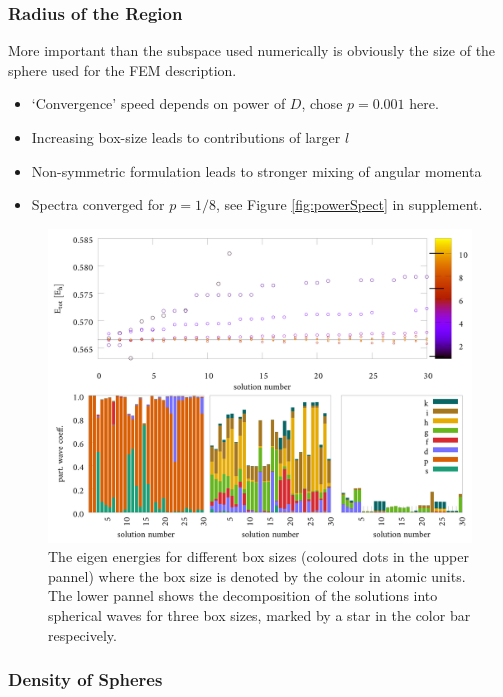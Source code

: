 \subsubsection{Radius of the Region}
\label{ch:bmSize}
More important than the subspace used numerically is obviously the size of the sphere used for the FEM description.
\begin{itemize}
   \item `Convergence' speed depends on power of $D$, chose $p= 0.001$ here.
   \item Increasing box-size leads to contributions of larger $l$ 
   \item Non-symmetric formulation leads to stronger mixing of angular momenta
   \item Spectra converged for $p=1/8$, see Figure \ref{fig:powerSpect} in supplement.
\end{itemize}
\begin{figure}
\includegraphics[width=\textwidth]{Figures/RadWave_p0_001.pdf}
\caption{The eigen energies for different box sizes (coloured dots in the upper pannel) where the box size is denoted by the colour in atomic units.
The lower pannel shows the decomposition of the solutions into spherical waves for three box sizes, marked by a star in the color bar respecively.}
\label{fig:RadWaves}
\end{figure}

\subsubsection{Density of Spheres}

